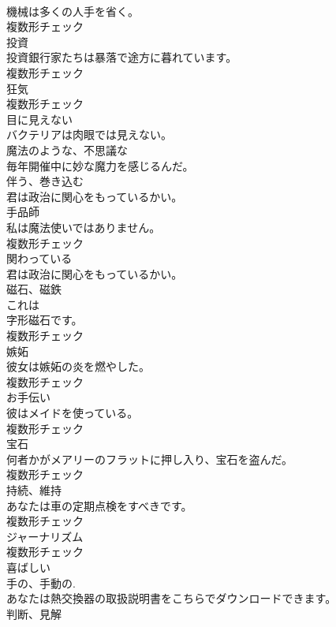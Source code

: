 \documentclass[8pt]{extreport}
\begin{document}
\begin{CJK}{UTF8}{min}
\\	機械は多くの人手を省く。	
\\	複数形チェック
\\	[名詞]	投資	
\\	投資銀行家たちは暴落で途方に暮れています。	
\\	複数形チェック
\\	[名詞]	狂気	
\\	複数形チェック
\\	[形容詞]	目に見えない	
\\	バクテリアは肉眼では見えない。	
\\	[形容詞]	魔法のような、不思議な	
\\	毎年開催中に妙な魔力を感じるんだ。	
\\	[動詞]	伴う、巻き込む	
\\	君は政治に関心をもっているかい。	
\\	[名詞]	手品師	
\\	私は魔法使いではありません。	
\\	複数形チェック
\\	[形容詞]	関わっている	
\\	君は政治に関心をもっているかい。	
\\	[名詞]	磁石、磁鉄	
\\	これは
\\	字形磁石です。	
\\	複数形チェック
\\	[名詞]	嫉妬	
\\	彼女は嫉妬の炎を燃やした。	
\\	複数形チェック
\\	[名詞]	お手伝い	
\\	彼はメイドを使っている。	
\\	複数形チェック
\\	[名詞]	宝石	
\\	何者かがメアリーのフラットに押し入り、宝石を盗んだ。	
\\	複数形チェック
\\	[名詞]	持続、維持	
\\	あなたは車の定期点検をすべきです。	
\\	複数形チェック
\\	[名詞]	ジャーナリズム	
\\	複数形チェック
\\	[形容詞]	喜ばしい	
\\	[形容詞]	手の、手動の.	
\\	あなたは熱交換器の取扱説明書をこちらでダウンロードできます。	
\\	[名詞]	判断、見解	

\end{CJK}
\end{document}
